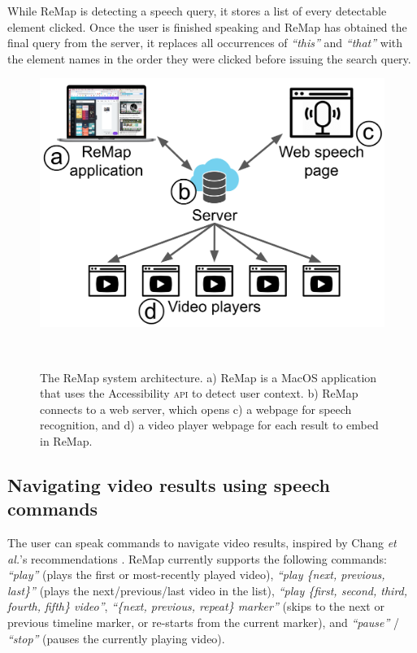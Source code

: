 While ReMap is detecting a speech query, it stores a list of every detectable element clicked. Once the user is finished speaking and ReMap has obtained the final query from the server, it replaces all occurrences of \textit{``this''} and \textit{``that''} with the element names in the order they were clicked before issuing the search query.

\begin{figure}[b!]
\centering
  \includegraphics[width=\textwidth]{remap/figures/system.png}
  \caption{The ReMap system architecture. a) ReMap is a MacOS application that uses the Accessibility \textsc{api} to detect user context. b) ReMap connects to a web server, which opens c) a webpage for speech recognition, and d) a video player webpage for each result to embed in ReMap.}~\label{fig:remap_system}
  \vspace{-0.2in}
\end{figure}

\subsection{Navigating video results using speech commands}
The user can speak commands to navigate video results, inspired by Chang \textit{et al.}'s recommendations \cite{Chang2019}. ReMap currently supports the following commands: \textit{``play''} (plays the first or most-recently played video), \textit{``play \{next, previous, last\}''} (plays the next/previous/last video in the list), \textit{``play \{first, second, third, fourth, fifth\} video''}, \textit{``\{next, previous, repeat\} marker''} (skips to the next or previous timeline marker, or re-starts from the current marker), and \textit{``pause''} / \textit{``stop''} (pauses the currently playing video).


